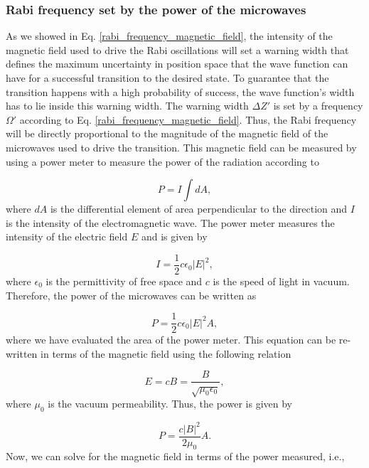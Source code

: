 \documentclass{article}
\begin{document}
\subsubsection{Rabi frequency set by the power of the microwaves}
As we showed in Eq. \ref{rabi_frequency_magnetic_field}, the intensity of the magnetic field used to drive the Rabi oscillations will set a warning width that defines the maximum uncertainty in position space that the wave function can have for a successful transition to the desired state. To guarantee that the transition happens with a high probability of success, the wave function's width has to lie inside this warning width. The warning width $\Delta Z'$ is set by a frequency $\Omega'$ according to Eq. \ref{rabi_frequency_magnetic_field}. Thus, the Rabi frequency will be directly proportional to the magnitude of the magnetic field of the microwaves used to drive the transition. This magnetic field can be measured by using a power meter to measure the power of the radiation according to

\begin{equation}
    P = I \int dA,
\end{equation}
%
where $dA$ is the differential element of area perpendicular to the direction and $I$ is the intensity of the electromagnetic wave. The power meter measures the intensity of the electric field $E$ and is given by

\begin{equation}
    I = \frac{1}{2} c \epsilon_{0} |E|^{2},
\end{equation}
%
where $\epsilon_{0}$ is the permittivity of free space and $c$ is the speed of light in vacuum. Therefore, the power of the microwaves can be written as

\begin{equation}
    P = \frac{1}{2} c \epsilon_{0} |E|^{2} A,
\end{equation}
%
where we have evaluated the area of the power meter. This equation can be re-written in terms of the magnetic field using the following relation

\begin{equation}
    E = c B = \frac{B}{\sqrt{\mu_{0} \epsilon_{0}}},
\end{equation}
%
where $\mu_{0}$ is the vacuum permeability. Thus, the power is given by

\begin{equation}\label{power_in_terms_of_B}
    P = \frac{c |B|^{2}}{2 \mu_{0}} A.
\end{equation}
%
Now, we can solve for the magnetic field in terms of the power measured, i.e.,
\end{document}
